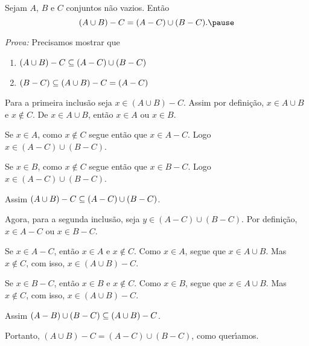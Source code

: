 \documentclass{beamer}
\begin{document}
    \begin{frame}
        \begin{proposicao}
            Sejam $A$, $B$ e $C$ \pause conjuntos n\~ao vazios. Ent\~ao\pause
            \[
                (A \cup B) - C = (A - C) \cup (B - C).\pause
            \]
        \end{proposicao}
        \textit{Prova: }\pause
        Precisamos mostrar que\pause
        \begin{enumerate}[label={\arabic*})]
            \item $(A \cup B) - C \subseteq (A - C) \cup (B - C)$\pause
            \item $(B - C) \subseteq (A \cup B) - C = (A - C)$\pause
        \end{enumerate}
        Para a primeira inclus\~ao \pause seja $x \in (A \cup B) - C$. \pause Assim por defini\c{c}\~ao, \pause $x \in A \cup B$ \pause e $x \notin C$. \pause De $x \in A \cup B$, \pause ent\~ao $x \in A$ ou $x \in B$.\pause
        
        Se $x \in A$, \pause como $x \notin C$ \pause segue ent\~ao que $x \in A - C$. \pause Logo $x \in (A - C) \cup (B - C)$.\pause

        Se $x \in B$, \pause como $x \notin C$ \pause segue ent\~ao que $x \in B - C$. \pause Logo $x \in (A - C) \cup (B - C)$.\pause
    \end{frame}

    \begin{frame}
        Assim $(A \cup B) - C \subseteq (A - C) \cup (B - C)$.\pause
        
        Agora, para a segunda inclus\~ao, \pause seja $y \in (A - C) \cup (B - C)$. \pause Por defini\c{c}\~ao, \pause $x \in A - C$ ou $x \in B - C$.\pause

        Se $x \in A - C$, \pause ent\~ao $x \in A$ e $x \notin C$. \pause Como $x \in A$, \pause segue que $x \in A \cup B$. \pause Mas $x \notin C$, \pause com isso, $x \in (A \cup B) - C$.\pause

        Se $x \in B - C$, \pause ent\~ao $x \in B$ \pause e $x \notin C$. \pause Como $x \in B$, \pause segue que $x \in A \cup B$. \pause Mas $x \notin C$, \pause com isso, $x \in (A \cup B) - C$.\pause
        
        Assim $(A - B) \cup (B - C) \subseteq (A \cup B) - C$.\pause

        Portanto, \pause $(A \cup B) - C = (A - C) \cup (B - C)$, \pause como quer{\'\i}amos.\qedsymbol
    \end{frame}
\end{document}
